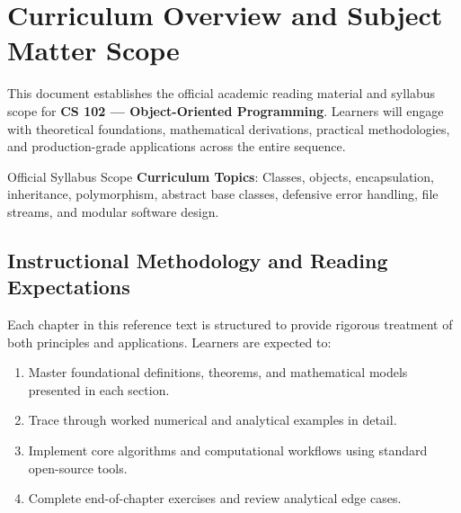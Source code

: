 \section{Curriculum Overview and Subject Matter Scope}

This document establishes the official academic reading material and syllabus scope for \textbf{CS 102 --- Object-Oriented Programming}. Learners will engage with theoretical foundations, mathematical derivations, practical methodologies, and production-grade applications across the entire sequence.

\begin{InsightBox}{Official Syllabus Scope}
  \textbf{Curriculum Topics}: Classes, objects, encapsulation, inheritance, polymorphism, abstract base classes, defensive error handling, file streams, and modular software design.
\end{InsightBox}

\subsection{Instructional Methodology and Reading Expectations}

Each chapter in this reference text is structured to provide rigorous treatment of both principles and applications. Learners are expected to:
\begin{enumerate}
  \item Master foundational definitions, theorems, and mathematical models presented in each section.
  \item Trace through worked numerical and analytical examples in detail.
  \item Implement core algorithms and computational workflows using standard open-source tools.
  \item Complete end-of-chapter exercises and review analytical edge cases.
\end{enumerate}

